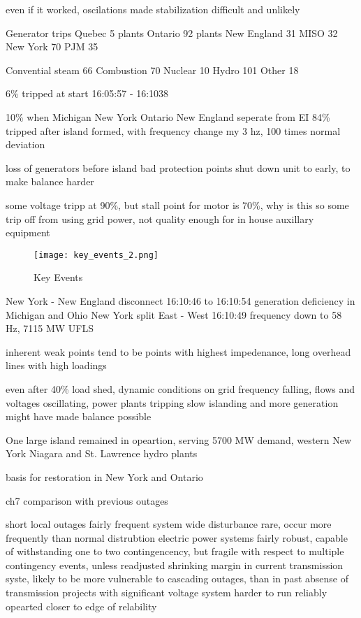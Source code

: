 even if it worked, oscilations made stabilization difficult and unlikely

Generator trips
Quebec 5 plants
Ontario 92 plants
New England 31
MISO 32
New York 70 
PJM 35

Convential steam 66
Combustion 70
Nuclear 10
Hydro 101
Other 18

6\% tripped at start 16:05:57 - 16:1038

10\% when Michigan New York Ontario New England seperate from EI
84\% tripped after island formed, with frequency change my 3 hz, 100 times normal deviation


loss of generators before island bad
protection points shut down unit to early, to make balance harder

some voltage tripp at 90\%, but stall point for motor is 70\%, why is this so
some trip off from using grid power, not quality enough for in house auxillary equipment


\begin{figure}
\texttt{[image: key\_events\_2.png]}
\caption{Key Events}
\end{figure}

New York - New England disconnect 16:10:46 to 16:10:54
generation deficiency in Michigan and Ohio
New York split East - West 16:10:49
frequency down to 58 Hz, 7115 MW UFLS

inherent weak points
tend to be points with highest impedenance, long overhead lines with high loadings

even after 40\% load shed, dynamic conditions on grid
frequency falling, flows and voltages oscillating, power plants tripping
slow islanding and more generation might have made balance possible


One large island remained in opeartion, serving 5700 MW demand, western New York
Niagara and St. Lawrence hydro plants

basis for restoration in New York and Ontario

ch7 comparison with previous outages

short local outages fairly frequent
system wide disturbance rare, occur more frequently than normal distrubtion
electric power systems fairly robust, capable of withstanding one to two contingencency, but fragile with respect to multiple contingency events, unless readjusted
shrinking margin in current transmission syste,
likely to be more vulnerable to cascading outages, than in past
absense of transmission projects with significant voltage
system harder to run reliably
opearted closer to edge of relability

